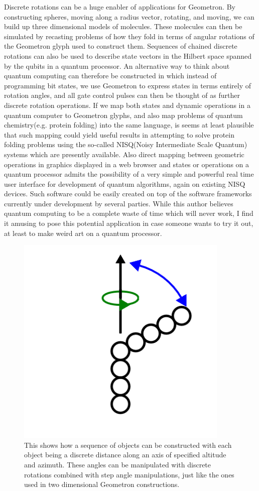 Discrete rotations can be a huge enabler of applications for Geometron.  By constructing spheres, moving along a radius vector, rotating, and moving, we can build up three dimensional models of molecules.  These molecules can then be simulated by recasting problems of how they fold in terms of angular rotations of the Geometron glyph used to construct them.  Sequences of chained discrete rotations can also be used to describe state vectors in the Hilbert space spanned by the qubits in a quantum processor.  An alternative way to think about quantum computing can therefore be constructed in which instead of programming bit states, we use Geometron to express states in terms entirely of rotation angles, and all gate control pulses can then be thought of as further discrete rotation operations.  If we map both states and dynamic operations in a quantum computer to Geometron glyphs, and also map problems of quantum chemistry(e.g. protein folding) into the same language, is seems at least plausible that such mapping could yield useful results in attempting to solve protein folding problems using the so-called NISQ(Noisy Intermediate Scale Quantum) systems which are presently available.  Also direct mapping between geometric operations in graphics displayed in a web browser and states or operations on a quantum processor admits the possibility of a very simple and powerful real time user interface for development of quantum algorithms, again on existing NISQ devices.  Such software could be easily created on top of the software frameworks currently under development by several parties. While this author believes quantum computing to be a complete waste of time which will never work, I find it amusing to pose this potential application in case someone wants to try it out, at least to make weird art on a quantum processor.  

\begin{figure}
	\centering
	\includegraphics[width=4in]{figures/geometron3d/angles.png}
	\caption[angles]
	{This shows how a sequence of objects can be constructed with each object being a discrete distance along an axis of specified altitude and azimuth.  These angles can be manipulated with discrete rotations combined with step angle manipulations, just like the ones used in two dimensional Geometron constructions.}
\end{figure}

